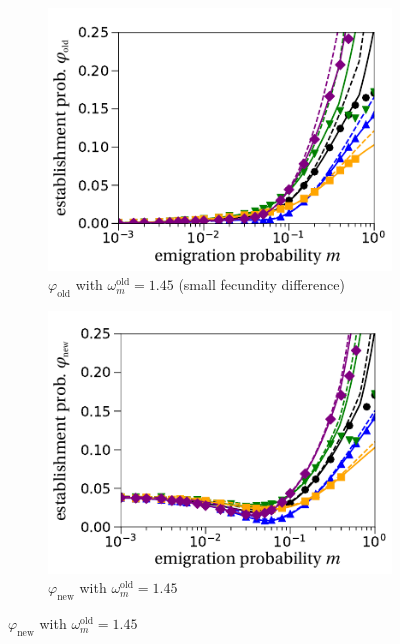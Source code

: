 \documentclass[a4paper,11pt]{article}
\begin{document}
\begin{figure}[t!]
\begin{subfigure}{.5\textwidth}
  		\includegraphics[width=\linewidth]{fig2c.pdf}
  		\caption{$\varphi_{\text{old}}$ with $\omega^\text{old}_m = 1.45$ (small fecundity difference)}
	\end{subfigure}%
	\begin{subfigure}{.5\textwidth}
 		 \centering
 		 \includegraphics[width=\linewidth]{fig2d.pdf}
  		\caption{$\varphi_{\text{new}}$ with $\omega^\text{old}_m = 1.45$}
	\end{subfigure}

\end{figure}
\end{document}
